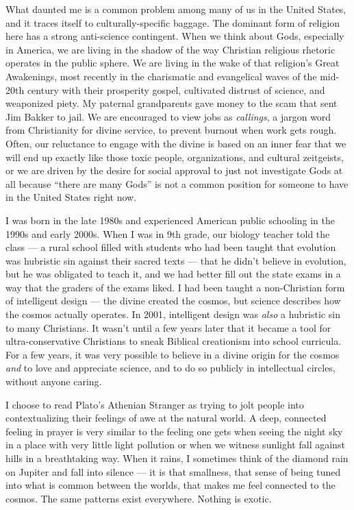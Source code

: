 \documentclass[
]{book}
\begin{document}
What daunted me is a common problem among many of us in the United States, and it traces itself to culturally-specific baggage. The dominant form of religion here has a strong anti-science contingent. When we think about Gods, especially in America, we are living in the shadow of the way Christian religious rhetoric operates in the public sphere. We are living in the wake of that religion's Great Awakenings, most recently in the charismatic and evangelical waves of the mid-20th century with their prosperity gospel, cultivated distrust of science, and weaponized piety. My paternal grandparents gave money to the scam that sent Jim Bakker to jail. We are encouraged to view jobs as \emph{callings}, a jargon word from Christianity for divine service, to prevent burnout when work gets rough. Often, our reluctance to engage with the divine is based on an inner fear that we will end up exactly like those toxic people, organizations, and cultural zeitgeists, or we are driven by the desire for social approval to just not investigate Gods at all because ``there are many Gods'' is not a common position for someone to have in the United States right now.

I was born in the late 1980s and experienced American public schooling in the 1990s and early 2000s. When I was in 9th grade, our biology teacher told the class --- a rural school filled with students who had been taught that evolution was hubristic sin against their sacred texts --- that he didn't believe in evolution, but he was obligated to teach it, and we had better fill out the state exams in a way that the graders of the exams liked. I had been taught a non-Christian form of intelligent design --- the divine created the cosmos, but science describes how the cosmos actually operates. In 2001, intelligent design was \emph{also} a hubristic sin to many Christians. It wasn't until a few years later that it became a tool for ultra-conservative Christians to sneak Biblical creationism into school curricula. For a few years, it was very possible to believe in a divine origin for the cosmos \emph{and} to love and appreciate science, and to do so publicly in intellectual circles, without anyone caring.

I choose to read Plato's Athenian Stranger as trying to jolt people into contextualizing their feelings of awe at the natural world. A deep, connected feeling in prayer is very similar to the feeling one gets when seeing the night sky in a place with very little light pollution or when we witness sunlight fall against hills in a breathtaking way. When it rains, I sometimes think of the diamond rain on Jupiter and fall into silence --- it is that smallness, that sense of being tuned into what is common between the worlds, that makes me feel connected to the cosmos. The same patterns exist everywhere. Nothing is exotic.
\end{document}
